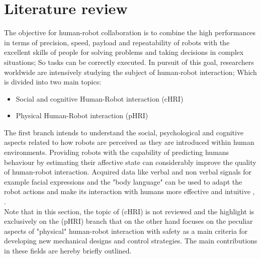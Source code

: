 \chapter{Literature review}
\label{chap:Litreview}
The objective for human-robot collaboration is to combine the high performances in terms of precision, speed, payload and repeatability of robots  with the excellent skills of people for solving problems and taking decisions in complex situations; So tasks can be correctly executed. In pursuit of this goal, researchers worldwide are intensively studying the subject of human-robot interaction; Which is divided into two main topics\cite{albu2005physical}:
\begin{itemize}
\item Social and cognitive Human-Robot interaction (cHRI)
\item Physical Human-Robot interaction (pHRI)
\end{itemize}
The first branch intends to understand the social, psychological and cognitive aspects related to how robots are perceived as they are introduced within human environments. Providing robots with the capability of predicting humans behaviour by estimating their affective state can considerably improve the quality of human-robot interaction. Acquired data like verbal and non verbal signals for example facial expressions and the "body language" can be used to adapt the robot actions and make its interaction with humans more effective and intuitive \cite{kulic2007affective}, \cite{mavridis2015review}. \\
Note that in this section, the topic of (cHRI) is not reviewed and the highlight is exclusively on the (pHRI) branch that on the other hand focuses on the peculiar aspects of "physical" human-robot interaction with safety as a main criteria for developing new mechanical designs and control strategies. The main contributions in these fields are hereby briefly outlined. 

